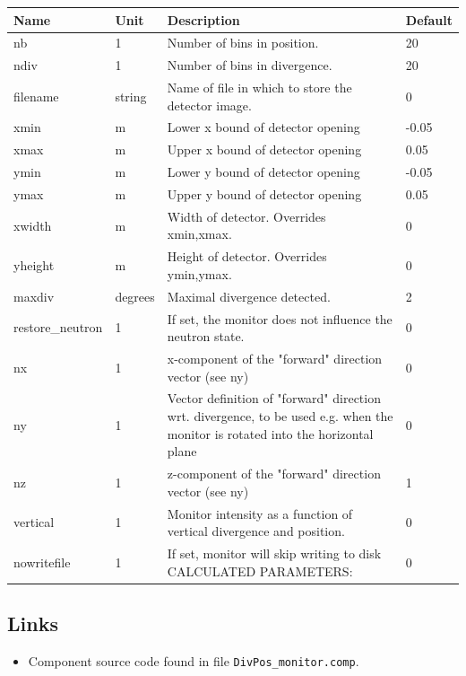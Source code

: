 \begin{longtable}{p{}p{}p{}p{}}
\toprule
\textbf{Name} & \textbf{Unit} & \textbf{Description} & \textbf{Default} \\
\midrule
\endhead
nb & 1 & Number of bins in position. & 20 \\
ndiv & 1 & Number of bins in divergence. & 20 \\
filename & string & Name of file in which to store the detector image. & 0 \\
xmin & m & Lower x bound of detector opening & -0.05 \\
xmax & m & Upper x bound of detector opening & 0.05 \\
ymin & m & Lower y bound of detector opening & -0.05 \\
ymax & m & Upper y bound of detector opening & 0.05 \\
xwidth & m & Width of detector. Overrides xmin,xmax. & 0 \\
yheight & m & Height of detector. Overrides ymin,ymax. & 0 \\
maxdiv & degrees & Maximal divergence detected. & 2 \\
restore\_neutron & 1 & If set, the monitor does not influence the neutron state. & 0 \\
nx & 1 & x-component of the "forward" direction vector (see ny) & 0 \\
ny & 1 & Vector definition of "forward" direction wrt. divergence, to be used e.g. when the monitor is rotated into the horizontal plane & 0 \\
nz & 1 & z-component of the "forward" direction vector (see ny) & 1 \\
vertical & 1 & Monitor intensity as a function of vertical divergence and position. & 0 \\
nowritefile & 1 & If set, monitor will skip writing to disk CALCULATED PARAMETERS: & 0 \\
\bottomrule
\end{longtable}

\subsection*{Links}
\begin{itemize}
  \item Component source code found in file \texttt{DivPos\_monitor.comp}.
\end{itemize}
